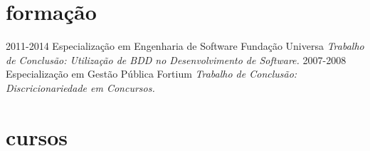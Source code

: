 \section{formação}

\begin{entrylist}
  \entry
    {2011-2014}
    {Especialização {\normalfont em Engenharia de Software}}
    {Fundação Universa}
    {\emph{Trabalho de Conclusão: Utilização de BDD no Desenvolvimento de Software.}}
  \entry
    {2007-2008}
    {Especialização {\normalfont em Gestão Pública}}
    {Fortium}
    {\emph{Trabalho de Conclusão: Discricionariedade em Concursos.}}
\end{entrylist}

\section{cursos}

